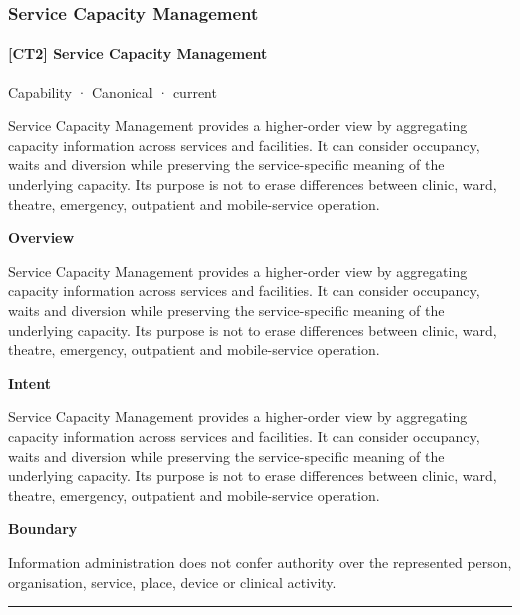 \subsubsection{Service Capacity Management}

\paragraph{[CT2] Service Capacity Management}

\label{element:d86105bf9c86445394088f65c895d37f}
{\small Capability · Canonical · current}\par

Service Capacity Management provides a higher-order view by aggregating capacity information across services and facilities. It can consider occupancy, waits and diversion while preserving the service-specific meaning of the underlying capacity. Its purpose is not to erase differences between clinic, ward, theatre, emergency, outpatient and mobile-service operation.



\textbf{Overview}



Service Capacity Management provides a higher-order view by aggregating capacity information across services and facilities. It can consider occupancy, waits and diversion while preserving the service-specific meaning of the underlying capacity. Its purpose is not to erase differences between clinic, ward, theatre, emergency, outpatient and mobile-service operation.



\textbf{Intent}



Service Capacity Management provides a higher-order view by aggregating capacity information across services and facilities. It can consider occupancy, waits and diversion while preserving the service-specific meaning of the underlying capacity. Its purpose is not to erase differences between clinic, ward, theatre, emergency, outpatient and mobile-service operation.



\textbf{Boundary}



Information administration does not confer authority over the represented person, organisation, service, place, device or clinical activity.



\medskip\hrule\medskip

